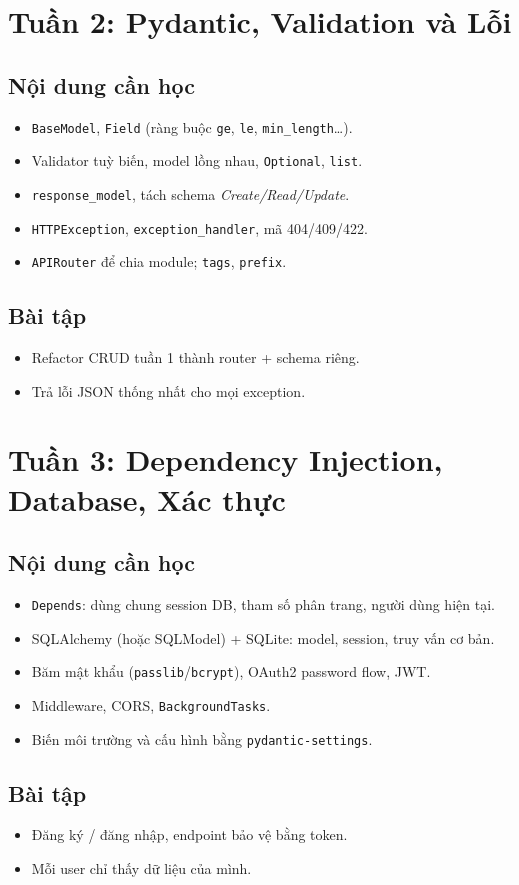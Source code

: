 \documentclass[11pt,a4paper]{article}
\newcommand{\week}[2]{\section{Tuần #1: #2}}
\begin{document}
\week{2}{Pydantic, Validation và Lỗi}
\subsection*{Nội dung cần học}
\begin{itemize}
  \item \texttt{BaseModel}, \texttt{Field} (ràng buộc \texttt{ge}, \texttt{le}, \texttt{min\_length}\ldots).
  \item Validator tuỳ biến, model lồng nhau, \texttt{Optional}, \texttt{list}.
  \item \texttt{response\_model}, tách schema \emph{Create/Read/Update}.
  \item \texttt{HTTPException}, \texttt{exception\_handler}, mã 404/409/422.
  \item \texttt{APIRouter} để chia module; \texttt{tags}, \texttt{prefix}.
\end{itemize}
\subsection*{Bài tập}
\begin{itemize}
  \item Refactor CRUD tuần 1 thành router + schema riêng.
  \item Trả lỗi JSON thống nhất cho mọi exception.
\end{itemize}

\week{3}{Dependency Injection, Database, Xác thực}
\subsection*{Nội dung cần học}
\begin{itemize}
  \item \texttt{Depends}: dùng chung session DB, tham số phân trang, người dùng hiện tại.
  \item SQLAlchemy (hoặc SQLModel) + SQLite: model, session, truy vấn cơ bản.
  \item Băm mật khẩu (\texttt{passlib}/\texttt{bcrypt}), OAuth2 password flow, JWT.
  \item Middleware, CORS, \texttt{BackgroundTasks}.
  \item Biến môi trường và cấu hình bằng \texttt{pydantic-settings}.
\end{itemize}
\subsection*{Bài tập}
\begin{itemize}
  \item Đăng ký / đăng nhập, endpoint bảo vệ bằng token.
  \item Mỗi user chỉ thấy dữ liệu của mình.
\end{itemize}
\end{document}
